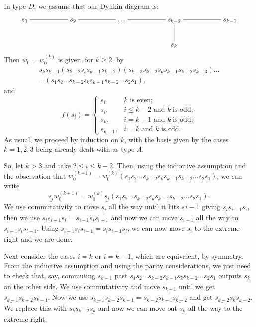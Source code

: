 \documentclass[a4paper]{amsart}
\begin{document}
In type $D$, we assume that our Dynkin diagram is:
\begin{displaymath}
\xymatrix{s_1\ar@{-}[rr]&&s_2\ar@{-}[rr]&&\dots\ar@{-}[rr]&&
s_{k-2}\ar@{-}[rr]\ar@{-}[d]&&s_{k-1}\\&&&&&&s_k&&} 
\end{displaymath}
Then $w_0=w_0^{(k)}$ is given, for $k\geq 2$, by 
\begin{multline*}
s_ks_{k-1}(s_{k-2}s_ks_{k-1}s_{k-2})
(s_{k-3}s_{k-2}s_ks_{k-1}s_{k-2}s_{k-3})\dots\\ \dots  (s_1s_2\dots 
s_{k-2}s_ks_{k-1}s_{k-2}\dots s_2s_1),
\end{multline*}
and 
\begin{displaymath}
f(s_i)=
\begin{cases}
s_i,& k\text{ is even};\\
s_i,& i\leq k-2\text{ and }k \text{ is odd};\\
s_k, & i=k-1\text{ and }k \text{ is odd};\\
s_{k-1}, & i=k\text{ and }k \text{ is odd}.
\end{cases}
\end{displaymath} 
As usual, we proceed by induction on $k$, with the basis given by
the cases $k=1,2,3$ being already dealt with as type $A$.

So, let $k>3$ and take $2\leq i \leq k-2$. Then, using the inductive
assumption and the observation that 
$w_0^{(k+1)}=w_0^{(k)}(s_1s_2\dots 
s_{k-2}s_ks_{k-1}s_{k-2}\dots s_2s_1)$, we can write 
\begin{displaymath}
\underline{s_i}w_0^{(k+1)}=
w_0^{(k)}\underline{s_i}(s_1s_2\dots 
s_{k-2}s_ks_{k-1}s_{k-2}\dots s_2s_1).
\end{displaymath}
We use commutativity to move $\underline{s_i}$ all the way until it hits
$s_{}i-1$ giving $\underline{s_i}s_{i-1}s_i$, then we use 
$\underline{s_i}s_{i-1}s_i=s_{i-1}s_i\underline{s_{i-1}}$
and now we can move $\underline{s_{i-1}}$ all the way to
$\underline{s_{i-1}}s_is_{i-1}$. Using 
$\underline{s_{i-1}}s_is_{i-1}=s_is_{i-1}\underline{s_i}$,
we can now move $\underline{s_i}$ to the extreme right and we are done.

Next consider the cases $i=k$ or  $i=k-1$, which are equivalent, by symmetry.
From the inductive assumption and using the parity considerations,
we just need to check that, say, commuting $\underline{s_{k-1}}$
past $s_1s_2\dots 
s_{k-2}s_{k-1}s_ks_{k-2}\dots s_2s_1$ outputs 
$\underline{s_{k}}$ on the other side.
We use commutativity and move $\underline{s_{k-1}}$ until we get
$\underline{s_{k-1}}s_{k-2}s_{k-1}$. Now we use
$\underline{s_{k-1}}s_{k-2}s_{k-1}=
s_{k-2}s_{k-1}\underline{s_{k-2}}$ and get
$\underline{s_{k-2}}s_ks_{k-2}$. We replace this with
$s_ks_{k-2}\underline{s_{k}}$ and now we can move out
$\underline{s_{k}}$ all the way to the extreme right.
\end{document}
